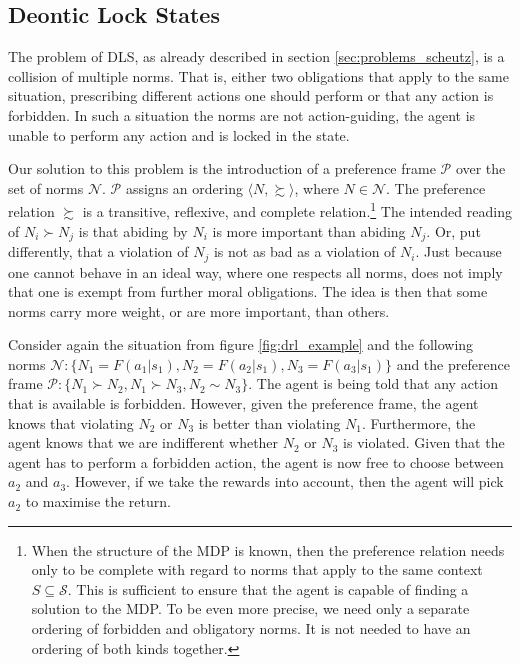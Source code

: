\subsection{Deontic Lock States}
\label{sec:dls}

The problem of DLS, as already described in section \ref{sec:problems_scheutz}, is a collision of multiple norms. That is, either two obligations that apply to the same situation, prescribing different actions one should perform or that any action is forbidden. In such a situation the norms are not action-guiding, the agent is unable to perform any action and is locked in the state. 

Our solution to this problem is the introduction of a preference frame $\mathcal{P}$ over the set of norms $\mathcal{N}$. $\mathcal{P}$ assigns an ordering $\langle N, \succsim \rangle$, where $N \in \mathcal{N}$. The preference relation $\succsim$ is a transitive, reflexive, and complete relation.\footnote{When the structure of the MDP is known, then the preference relation needs only to be complete with regard to norms that apply to the same context $S \subseteq \mathcal{S}$. This is sufficient to ensure that the agent is capable of finding a solution to the MDP. To be even more precise, we need only a separate ordering of forbidden and obligatory norms. It is not needed to have an ordering of both kinds together.} The intended reading of $N_i \succ N_j$ is that abiding by $N_i$ is more important than abiding $N_j$. Or, put differently, that a violation of $N_j$ is not as bad as a violation of $N_i$. Just because one cannot behave in an ideal way, where one respects all norms, does not imply that one is exempt from further moral obligations. The idea is then that some norms carry more weight, or are more important, than others. 

Consider again the situation from figure \ref{fig:drl_example} and the following norms $\mathcal{N}:\{N_1 = F(a_1 | s_1), N_2 = F(a_2 | s_1), N_3 = F(a_3 | s_1)\}$ and the preference frame $\mathcal{P}: \{N_1 \succ N_2, N_1 \succ N_3, N_2 \sim N_3 \}$. The agent is being told that any action that is available is forbidden. However, given the preference frame, the agent knows that violating $N_2$ or $N_3$ is better than violating $N_1$. Furthermore, the agent knows that we are indifferent whether $N_2$ or $N_3$ is violated. Given that the agent has to perform a forbidden action, the agent is now free to choose between $a_2$ and $a_3$. However, if we take the rewards into account, then the agent will pick $a_2$ to maximise the return.

